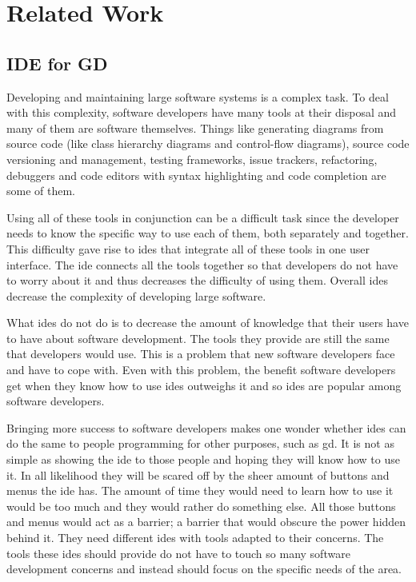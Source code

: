 \documentclass{./llncs2e/llncs}
\begin{document}
\section{Related Work}

\subsection{IDE for GD}
	Developing and maintaining large software systems is a complex task.
	To deal with this complexity, software developers have many tools at their disposal and many of them are software themselves.
	Things like generating diagrams from source code (like class hierarchy diagrams and control-flow diagrams), source code versioning and management, testing frameworks, issue trackers, refactoring, debuggers and code editors with syntax highlighting and code completion are some of them.

	Using all of these tools in conjunction can be a difficult task since the developer needs to know the specific way to use each of them, both separately and together.
	This difficulty gave rise to \ac{ide}s that integrate all of these tools in one user interface.
	The \ac{ide} connects all the tools together so that developers do not have to worry about it and thus decreases the difficulty of using them.
	Overall \ac{ide}s decrease the complexity of developing large software.

	What \ac{ide}s do not do is to decrease the amount of knowledge that their users have to have about software development.
	The tools they provide are still the same that developers would use.
	This is a problem that new software developers face and have to cope with.
	Even with this problem, the benefit software developers get when they know how to use \ac{ide}s outweighs it and so \ac{ide}s are popular among software developers.

	Bringing more success to software developers makes one wonder whether \ac{ide}s can do the same to people programming for other purposes, such as \ac{gd}.
	It is not as simple as showing the \ac{ide} to those people and hoping they will know how to use it.
	In all likelihood they will be scared off by the sheer amount of buttons and menus the \ac{ide} has.
	The amount of time they would need to learn how to use it would be too much and they would rather do something else.
	All those buttons and menus would act as a barrier; a barrier that would obscure the power hidden behind it.
	They need different \ac{ide}s with tools adapted to their concerns.
	The tools these \ac{ide}s should provide do not have to touch so many software development concerns and instead should focus on the specific needs of the area.
\end{document}
